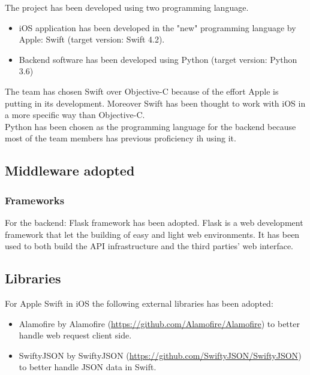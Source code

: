 \documentclass{article}
\begin{document}
The project has been developed using two programming language. 

\begin{itemize}
	\item iOS application has been developed in the "new" programming language by Apple: Swift (target version: Swift 4.2).
	\item  Backend software has been developed using Python (target version: Python 3.6)
\end{itemize}

The team has chosen Swift over Objective-C because of the effort Apple is putting in its development. Moreover Swift has been thought to work with iOS in a more specific way than Objective-C.\\
Python has been chosen as the programming language for the backend because most of the team members has previous proficiency ih using it.
\subsection{Middleware adopted}

\subsubsection{Frameworks}
For the backend: Flask framework has been adopted. Flask is a web development framework that let the building of easy and light web environments. It has been used to both build the API infrastructure and the third parties' web interface.

\subsection{Libraries}
For Apple Swift in iOS the following external libraries has been adopted:
\begin{itemize}
	\item Alamofire by Alamofire (\url{https://github.com/Alamofire/Alamofire}) to better handle web request client side.
	\item SwiftyJSON by SwiftyJSON (\url{https://github.com/SwiftyJSON/SwiftyJSON}) to better handle JSON data in Swift.
\end{itemize}
\end{document}
